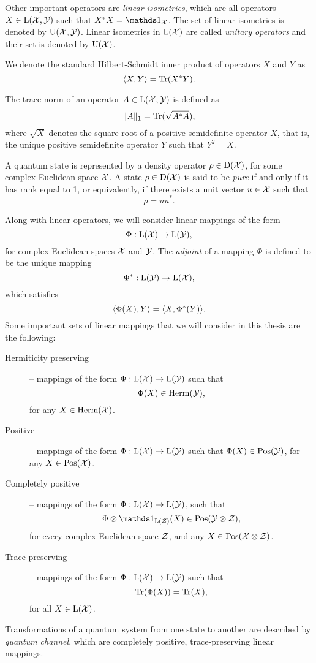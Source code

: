 Other important operators are \emph{linear isometries}, which are all operators
$X\in\mathrm{L}(\mathcal{X},\mathcal{Y})$ such that $X^{\ast}X=\I_{\X}$. The set of linear isometries is 
denoted by $\mathrm{U}(\mathcal{X},\mathcal{Y})$.
Linear isometries in $\mathrm{L}(\mathcal{X})$ are called \emph{unitary operators} and their 
set is denoted by $\mathrm{U}(\mathcal{X})$.

We denote the standard Hilbert-Schmidt inner product of operators
$X$ and $Y$ as
\begin{equation}
  \langle X , Y\rangle = \operatorname{Tr}(X^{\ast}Y).
\end{equation}

The trace norm of an operator $A\in\mathrm{L}(\mathcal{X},\mathcal{Y})$ is defined as
\begin{equation}
  \lVert A\rVert_{1} = \operatorname{Tr}(\sqrt{A^{\ast}A}),
\end{equation}
where $\sqrt{X}$ denotes the square root of a positive semidefinite
operator $X$, that is, the unique positive semidefinite operator $Y$ such that $Y^{2} = X$.

A quantum state is represented by a density operator $\rho\in\mathrm{D}(\mathcal{X})$, 
for some complex Euclidean space $\mathcal{X}$. A state $\rho\in\mathrm{D}(\mathcal{X})$ is said 
to be \emph{pure} if and only if it has rank equal to 1, or equivalently, 
if there exists a unit vector $u\in\mathcal{X}$ such that
\[
  \rho = uu^{\ast}.
\]

Along with linear operators, we will consider linear mappings of the form
\[
  \Phi:\mathrm{L}(\mathcal{X}) \rightarrow \mathrm{L}(\mathcal{Y}),
\]
for complex Euclidean spaces $\mathcal{X}$ and $\mathcal{Y}$.
The \emph{adjoint} of a mapping $\Phi$ is defined to be the unique mapping 
\[
  \Phi^{\ast}:\mathrm{L}(\mathcal{Y}) \rightarrow \mathrm{L}(\mathcal{X}),
\]
which satisfies 
\begin{equation}
\label{eq:adjoint-map}
  \langle \Phi(X) , Y\rangle = \langle X , \Phi^{\ast}(Y)\rangle.
\end{equation}
Some important sets of linear mappings that we will consider in this thesis are
the following:
\begin{description}
\item[Hermiticity preserving] -- mappings of the form 
  $\Phi:\mathrm{L}(\mathcal{X})\to\mathrm{L}(\mathcal{Y})$ such that \[\Phi(X) \in \mathrm{Herm}(\mathcal{Y}),\] for any $X\in\mathrm{Herm}(\mathcal{X})$.
\item[Positive] -- mappings of the form 
  $\Phi:\mathrm{L}(\mathcal{X})\to\mathrm{L}(\mathcal{Y})$ such that $\Phi(X) \in \mathrm{Pos}(\mathcal{Y})$, for any $X\in\mathrm{Pos}(\mathcal{X})$.
\item[Completely positive] -- mappings of the form 
  $\Phi:\mathrm{L}(\mathcal{X})\to\mathrm{L}(\mathcal{Y})$, such that 
  \[\Phi\otimes\I_{\Lin(\Z)}(X)\in\Pos(\Y\otimes\Z),\]
  for every complex Euclidean space $\mathcal{Z}$, and any $X\in\mathrm{Pos}(\mathcal{X}\otimes\mathcal{Z})$.
\item[Trace-preserving] -- mappings of the form
  $\Phi:\mathrm{L}(\mathcal{X})\to\mathrm{L}(\mathcal{Y})$ such that 
  \[ \operatorname{Tr}(\Phi(X)) = \operatorname{Tr}(X),\] 
  for all $X\in\mathrm{L}(\mathcal{X})$.
\end{description}
Transformations of a quantum system from one state to another are described by 
\emph{quantum channel}, which are completely positive, trace-preserving linear mappings.

